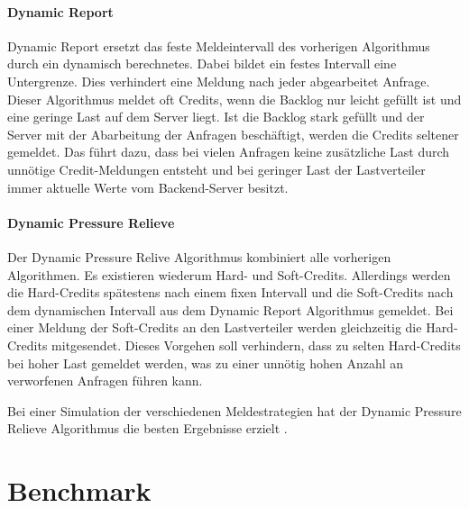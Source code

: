 \documentclass[a4paper, 12pt, BCOR10mm, DIV12, toc=bibliography, toc=listof, german]{scrbook}
\begin{document}

			\paragraph{Dynamic Report} %
			\label{par:dynamic-report}

			Dynamic Report ersetzt das feste Meldeintervall des vorherigen Algorithmus durch ein dynamisch
			berechnetes. Dabei bildet ein festes Intervall eine Untergrenze. Dies verhindert eine Meldung nach
			jeder abgearbeitet Anfrage. Dieser Algorithmus meldet oft Credits, wenn die Backlog nur leicht
			gefüllt ist und eine geringe Last	auf dem Server liegt. Ist die Backlog stark gefüllt und der
			Server mit der Abarbeitung der Anfragen beschäftigt, werden die Credits seltener gemeldet. Das
			führt dazu, dass bei vielen Anfragen keine zusätzliche Last durch unnötige Credit-Meldungen entsteht
			und bei geringer Last der Lastverteiler immer aktuelle Werte vom Backend-Server besitzt.


			\paragraph{Dynamic Pressure Relieve} %
			\label{par:dynamic-pressure-relieve}

			Der Dynamic Pressure Relive Algorithmus kombiniert alle vorherigen Algorithmen. Es existieren
			wiederum Hard- und Soft-Credits. Allerdings werden die Hard-Credits spätestens nach einem
			fixen Intervall und die Soft-Credits nach dem dynamischen Intervall aus dem Dynamic Report
			Algorithmus gemeldet. Bei einer Meldung der Soft-Credits an den Lastverteiler werden
			gleichzeitig die Hard-Credits mitgesendet. Dieses Vorgehen soll verhindern, dass zu selten
			Hard-Credits bei hoher Last gemeldet werden, was zu einer unnötig hohen Anzahl an verworfenen
			Anfragen führen kann.


			Bei einer Simulation der verschiedenen Meldestrategien hat der Dynamic Pressure Relieve
			Algorithmus die besten Ergebnisse erzielt \cite{scsczile2008}.


		\section{Benchmark} %
		\label{sec:Benchmark}
\end{document}
